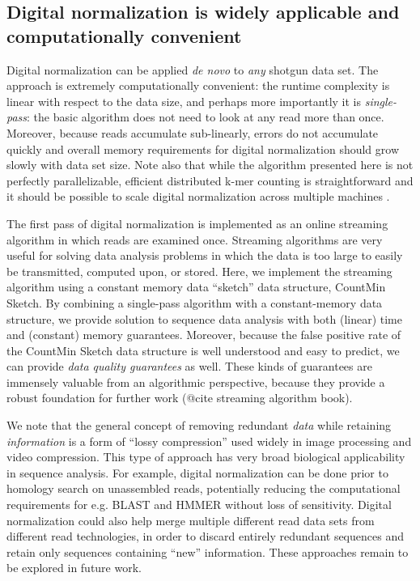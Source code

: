 \documentclass[10pt]{article}
\begin{document}
\subsection*{Digital normalization is widely applicable and computationally convenient}

Digital normalization can be applied {\em de novo} to {\em any} shotgun data set.  The
approach is extremely computationally convenient: the runtime
complexity is linear with respect to the data size, and perhaps more
importantly it is {\em single-pass}: the basic algorithm does not need to
look at any read more than once.  Moreover, because reads
accumulate sub-linearly, errors do not accumulate quickly and overall
memory requirements for digital normalization should grow slowly with
data set size.  Note also that while the algorithm presented here is
not perfectly parallelizable, efficient distributed k-mer counting is
straightforward and it should be possible to scale digital normalization
across multiple machines \cite{pubmed19357099}.

The first pass of digital normalization is implemented as an online
streaming algorithm in which reads are examined once.  Streaming
algorithms are very useful for solving data analysis problems in which
the data is too large to easily be transmitted, computed upon, or
stored.  Here, we implement the streaming algorithm using a constant
memory data ``sketch'' data structure, CountMin Sketch.  By combining
a single-pass algorithm with a constant-memory data structure, we
provide solution to sequence data analysis with both (linear) time and
(constant) memory guarantees. Moreover, because the false positive
rate of the CountMin Sketch data structure is well understood and easy
to predict, we can provide {\em data quality guarantees} as well.
These kinds of guarantees are immensely valuable from an algorithmic
perspective, because they provide a robust foundation for further work
(@cite streaming algorithm book).

We note that the general concept of removing redundant {\em data}
while retaining {\em information} is a form of ``lossy compression''
used widely in image processing and video compression.  This type of approach has very broad biological applicability in sequence analysis.  For example,
digital normalization can be done prior to homology search on
unassembled reads, potentially reducing the computational requirements
for e.g. BLAST and HMMER without loss of sensitivity.
Digital normalization could also help merge multiple
different read data sets from different read technologies, in order to
discard entirely redundant sequences and retain only sequences
containing ``new'' information.  These approaches remain to be
explored in future work.
\end{document}
